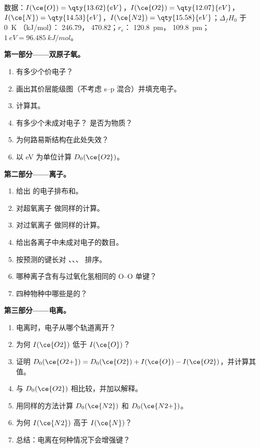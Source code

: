 \begin{problem}
\label{pb:b2:diatomic-mos:1}
数据：$I(\ce{O}) = \qty{13.62}{eV}$，$I(\ce{O2}) = \qty{12.07}{eV}$，$I(\ce{N}) =
\qty{14.53}{eV}$，$I(\ce{N2}) = \qty{15.58}{eV}$；$\Delta_f H_0$ 于 \qty{0}{K}
（\unit{kJ/mol}）： 246.79， 470.82；$r_e$： \qty{120.8}{pm}，
\qty{109.8}{pm}；$1\ \unit{eV} = \qty{96.485}{kJ/mol}$。

\medskip
\noindent\textbf{第一部分——双原子氧。}
\begin{enumerate}
  \item {} 有多少个价电子？
  \item 画出其价层能级图（不考虑 s--p 混合）并填充电子。
  \item 计算其。
  \item 有多少个未成对电子？ 是否为物质？
  \item 为何路易斯结构在此处失效？
  \item 以 \unit{eV} 为单位计算 $D_0(\ce{O2})$。
\end{enumerate}

\medskip
\noindent\textbf{第二部分——离子。}
\begin{enumerate}[resume]
  \item 给出  的电子排布和。
  \item 对超氧离子  做同样的计算。
  \item 对过氧离子  做同样的计算。
  \item 给出各离子中未成对电子的数目。
  \item 按预测的键长对 、、、 排序。
  \item 哪种离子含有与过氧化氢相同的 O--O 单键？
  \item 四种物种中哪些是的？
\end{enumerate}

\medskip
\noindent\textbf{第三部分——电离。}
\begin{enumerate}[resume]
  \item {} 电离时，电子从哪个轨道离开？
  \item 为何 $I(\ce{O2})$ 低于 $I(\ce{O})$？
  \item 证明 $D_0(\ce{O2+}) = D_0(\ce{O2}) + I(\ce{O}) - I(\ce{O2})$，并计算其值。
  \item 与 $D_0(\ce{O2})$ 相比较，并加以解释。
  \item 用同样的方法计算 $D_0(\ce{N2})$ 和 $D_0(\ce{N2+})$。
  \item 为何 $I(\ce{N2})$ 高于 $I(\ce{N})$？
  \item 总结：电离在何种情况下会增强键？
\end{enumerate}


\end{problem}
